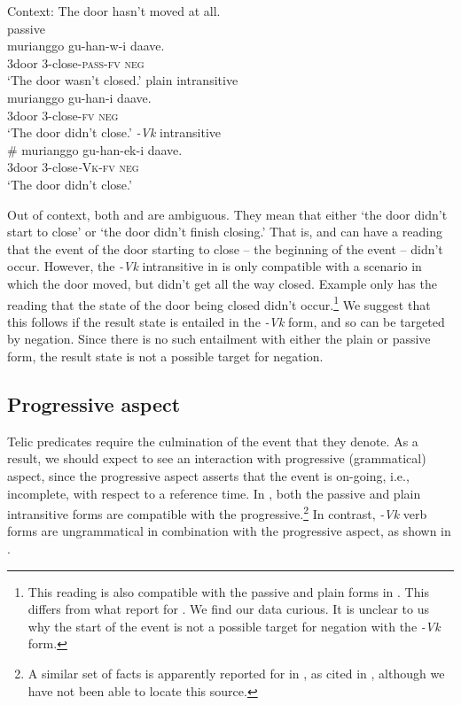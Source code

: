 \documentclass[output=paper]{langsci/lanmgscibook}
\begin{document}
\ea\label{ex:gluckman:13} 
{Context: The door hasn’t moved at all.}\\
  \ea\label{ex:gluckman:13a}
  {{passive}}\\
  \gll   murianggo gu-han-w-i           daave.\\
	3door        3-close-\textsc{pass}-\textsc{fv}    \textsc{neg}\\
  \glt ‘The door wasn’t closed.’
  \ex\label{ex:gluckman:13b}
  {{plain intransitive}}\\
  \gll   murianggo gu-han-i     daave.\\
	3door         3-close-\textsc{fv}  \textsc{neg}\\
  \glt ‘The door didn’t close.’
  \ex\label{ex:gluckman:13c}
  { {\textit{-Vk}}{ intransitive}}\\
  \gll   \# murianggo gu-han-ek-i      daave.\\
	  {}  3door         3-close\textit{-}\textsc{Vk}-\textsc{fv}   \textsc{neg}\\
  \glt ‘The door didn’t close.’
  \z
\z

Out of context, both  and  are ambiguous. They mean that either ‘the door didn’t start to close’ or ‘the door didn’t finish closing.’ That is,  and  can have a reading that the event of the door starting to close – the beginning of the event – didn’t occur. However, the \textit{-Vk} intransitive in  is only compatible with a scenario in which the door moved, but didn’t get all the way closed. Example  only has the reading that the state of the door being closed didn’t occur.\footnote{This reading is also compatible with the passive and plain forms in . This differs from what \citet{Dubinsky1996} report for . We find our  data curious. It is unclear to us why the start of the event is not a possible target for negation with the \textit{-Vk} form.}  We suggest that this follows if the result state is entailed in the \textit{-Vk} form, and so can be targeted by negation. Since there is no such entailment with either the plain or passive form, the result state is not a possible target for negation.

\subsection{Progressive aspect}

Telic predicates require the culmination of the event that they denote. As a result, we should expect to see an interaction with progressive (grammatical) aspect, since the progressive aspect asserts that the event is on-going, i.e., incomplete, with respect to a reference time. In , both the passive  and plain intransitive  forms are compatible with the progressive.\footnote{A similar set of facts is apparently reported for  in \citet{Mavromanolaki2002}, as cited in \citet{AlexiadouEtAl2015}, although we have not been able to locate this source.} In contrast, \textit{-Vk} verb forms are ungrammatical in combination with the progressive aspect, as shown in .
\end{document}
